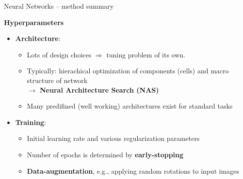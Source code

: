 \documentclass[11pt,compress,t,notes=noshow, xcolor=table]{beamer}
\newcommand{\highlight}[1]{\textcolor{hlcol}{\textbf{#1}}}
\begin{document}
\begin{frame2}{Neural Networks -- method summary}

\footnotesize


\highlight{Hyperparameters}

\begin{itemize}
  \item \textbf{Architecture}:
  \begin{itemize}
    \item Lots of design choices $\Rightarrow$ tuning problem of its own.
    \item Typically: hierachical optimization of components (cells) and macro structure of network\\ 
    $\rightarrow$ \textbf{Neural Architecture Search (NAS)}
    \item Many predifined (well working) architectures exist for standard tasks
  \end{itemize}
  \item \textbf{Training}:
  \begin{itemize}
    \item Initial learning rate and various regularization parameters
    \item Number of epochs is determined by \textbf{early-stopping}
    \item \textbf{Data-augmentation}, e.g., applying random rotations to input images
  \end{itemize}
\end{itemize}

\end{frame2}
\end{document}
